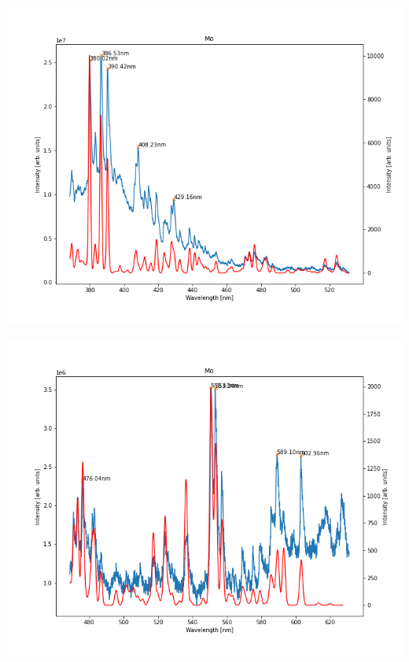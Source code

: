 \documentclass{beamer}
\begin{document}
\begin{frame}
    \includegraphics[scale=0.45]{Mo/450nm.png}
\end{frame}

\begin{frame}
    \includegraphics[scale=0.45]{Mo/550.png}
\end{frame}
\end{document}
